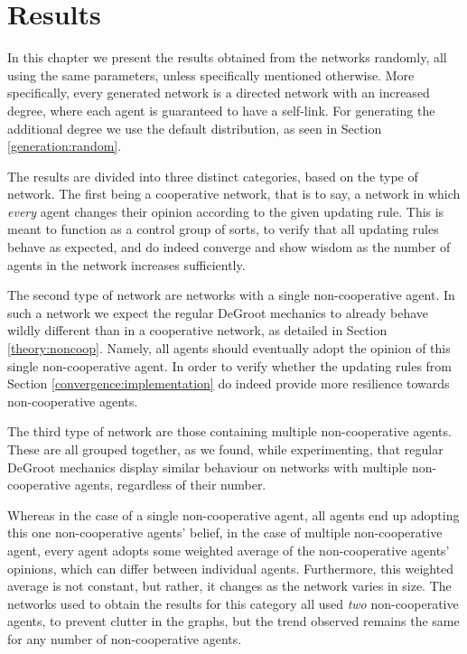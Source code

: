 \documentclass[a4paper, 12pt]{report}
\begin{document}
\chapter{Results}
\label{chapter:results}

In this chapter we present the results obtained from the networks randomly, all using the same parameters, unless specifically mentioned otherwise. More specifically, every generated network is a directed network with an increased degree, where each agent is guaranteed to have a self-link. For generating the additional degree we use the default distribution, as seen in Section \ref{generation:random}.

The results are divided into three distinct categories, based on the type of network. The first being a cooperative network, that is to say, a network in which \emph{every} agent changes their opinion according to the given updating rule. This is meant to function as a control group of sorts, to verify that all updating rules behave as expected, and do indeed converge and show wisdom as the number of agents in the network increases sufficiently.

The second type of network are networks with a single non-cooperative agent. In such a network we expect the regular DeGroot mechanics to already behave wildly different than in a cooperative network, as detailed in Section \ref{theory:noncoop}. Namely, all agents should eventually adopt the opinion of this single non-cooperative agent. In order to verify whether the updating rules from Section \ref{convergence:implementation} do indeed provide more resilience towards non-cooperative agents.

The third type of network are those containing multiple non-cooperative agents. These are all grouped together, as we found, while experimenting, that regular DeGroot mechanics display similar behaviour on networks with multiple non-cooperative agents, regardless of their number. 

Whereas in the case of a single non-cooperative agent, all agents end up adopting this one non-cooperative agents' belief, in the case of multiple non-cooperative agent, every agent adopts some weighted average of the non-cooperative agents' opinions, which can differ between individual agents. Furthermore, this weighted average is not constant, but rather, it changes as the network varies in size. The networks used to obtain the results for this category all used \emph{two} non-cooperative agents, to prevent clutter in the graphs, but the trend observed remains the same for any number of non-cooperative agents.
\end{document}
